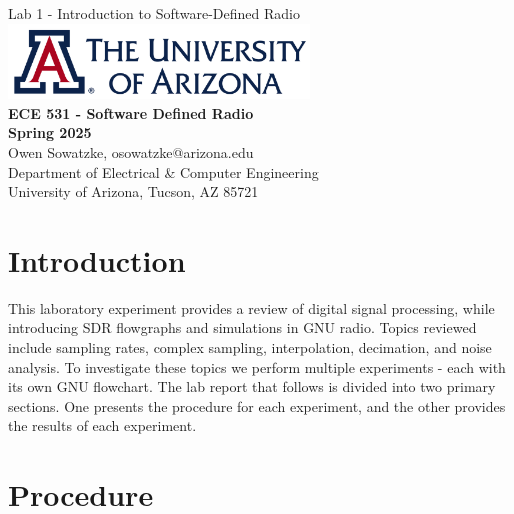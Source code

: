\documentclass{article}
\begin{document}
\begin{titlepage}
	\centering
	{\huge Lab 1 - Introduction to Software-Defined Radio}\\[0.25 in]
	\includegraphics[width=0.6\textwidth]{ua_logo.png}\\[0.25 in]
	{\large \textbf{ECE 531 - Software Defined Radio\\[0.25 in]
	Spring 2025\\[0.25 in]}}
	{\large Owen Sowatzke, osowatzke@arizona.edu\\[0.05 in]
	Department of Electrical \& Computer Engineering\\[0.05 in]
	University of Arizona, Tucson, AZ 85721\\[0.5 in]}
	\hypersetup{linkcolor=navy-blue}
	\noindent\hrulefill
	\tableofcontents
	\noindent\hrulefill
\end{titlepage}

\setlength{\parindent}{0pt}

\section{Introduction}

This laboratory experiment provides a review of digital signal processing, while introducing SDR flowgraphs and simulations in GNU radio. Topics reviewed include sampling rates, complex sampling, interpolation, decimation, and noise analysis. To investigate these topics we perform multiple experiments - each with its own GNU flowchart. The lab report that follows is divided into two primary sections. One presents the procedure for each experiment, and the other provides the results of each experiment.

\section{Procedure}

\end{document}
